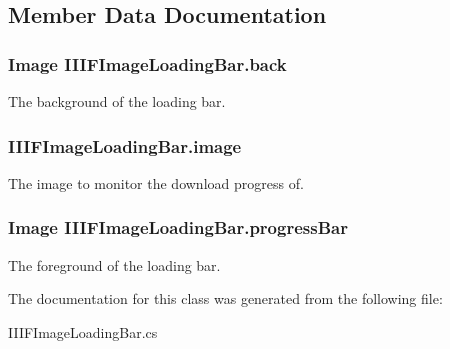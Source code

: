 \subsection{Member Data Documentation}
\subsubsection[{back}]{\setlength{\rightskip}{0pt plus 5cm}Image I\+I\+I\+F\+Image\+Loading\+Bar.\+back}\label{class_i_i_i_f_image_loading_bar_a6dd3836a2b2b5d21ff6350e6a5b75746}


The background of the loading bar. 

\subsubsection[{image}]{ I\+I\+I\+F\+Image\+Loading\+Bar.\+image}\label{class_i_i_i_f_image_loading_bar_a06002000920eb3815de43443a5cf36d1}


The image to monitor the download progress of. 

\subsubsection[{progress\+Bar}]{\setlength{\rightskip}{0pt plus 5cm}Image I\+I\+I\+F\+Image\+Loading\+Bar.\+progress\+Bar}\label{class_i_i_i_f_image_loading_bar_a4890e8e5a52ec51f2a740d1b77fdf1a9}


The foreground of the loading bar. 



The documentation for this class was generated from the following file\+:\begin{DoxyCompactItemize}
\item 
I\+I\+I\+F\+Image\+Loading\+Bar.\+cs\end{DoxyCompactItemize}
